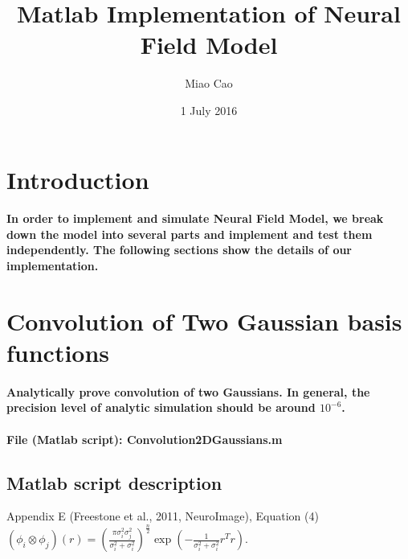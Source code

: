 \documentclass[a4paper, 12pt, english]{article}
\title{Matlab Implementation of Neural Field Model}
\author{Miao Cao}
\date{1 July 2016}
\begin{document}
\begin{titlepage}\centering
\vspace*{\fill}
\maketitle
\vspace*{\fill}
\end{titlepage}

\tableofcontents

\newpage




\section{Introduction}
\paragraph{In order to implement and simulate Neural Field Model, we break down
the model into several parts and implement and test them independently. The
following sections show the details of our implementation.}

\newpage





\section{Convolution of Two Gaussian basis functions}

\paragraph{Analytically prove convolution of two Gaussians. In general, the
precision level of analytic simulation should be around $10^{-6}$.}

\paragraph{File (Matlab script): Convolution2DGaussians.m}

\subsection*{Matlab script description}

Appendix E (Freestone et al., 2011, NeuroImage), Equation (4) $\left(\phi_{i}\otimes\phi_{j}\right)(r)=(\frac{\pi\sigma_{i}^{2}\sigma_{j}^{2}}{\sigma_{i}^{2}+\sigma_{i}^{2}})^{\frac{n}{2}}\exp(-\frac{1}{\sigma_{i}^{2}+\sigma_{i}^{2}}r^{T}r)$.
\end{document}

